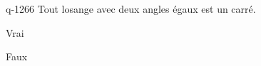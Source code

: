 \begin{truefalse}{q-1266}
Tout losange avec deux angles égaux est un carré.
\item Vrai
\item* Faux
\end{truefalse}

